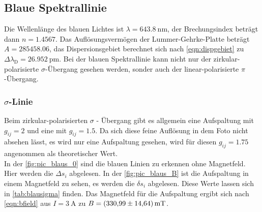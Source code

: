  
\subsection{Blaue Spektrallinie}

  \noindent Die Wellenlänge des blauen Lichtes ist $\lambda = \SI{643.8}{\nano\metre}$, der Brechungsindex beträgt dann $n = \num{1.4567}$. 
  Das Auflösungsvermögen der Lummer-Gehrke-Platte beträgt $A = \num{285458.06}$, das Dispersionsgebiet berechnet sich nach \eqref{eqn:dispgebiet} zu $\Delta \lambda_\text{D} = \SI{26.952}{\pico\metre}$.
  Bei der blauen Spektrallinie kann nicht nur der zirkular-polarisierte $\sigma$-Übergang gesehen werden, sonder auch der linear-polarisierte 
  $\pi$-Übergang. 

  \subsubsection{\texorpdfstring{$\sigma$}{}-Linie}

    \noindent 
    Beim zirkular-polarisierten $\sigma$ - Übergang gibt es allgemein eine Aufspaltung mit $g_{ij} = \num{2}$ und eine mit $g_{ij} = \num{1.5}$. 
    Da sich diese feine Auflösung in dem Foto nicht absehen lässt, es wird nur eine Aufspaltung gesehen, wird für diesen $g_{ij} = \num{1.75}$ angenommen 
    als theoretischer Wert. \\ 
    In der \autoref{fig:pic_blaus_0} sind die blauen Linien zu erkennen ohne Magnetfeld. Hier werden die $\Delta s_i$ abgelesen. In der \autoref{fig:pic_blaus_B} 
    ist die Aufspaltung in einem Magnetfeld zu sehen, es werden die $\delta s_i$ abgelesen. Diese Werte lassen sich in \autoref{tab:blausigma} finden. 
    Das Magnetfeld für die Aufspaltung ergibt sich nach \eqref{eqn:bfield} aus $I = \SI{3}{\ampere}$ zu $B = \SI{330.99 (1464)}{\milli\tesla}$. 

